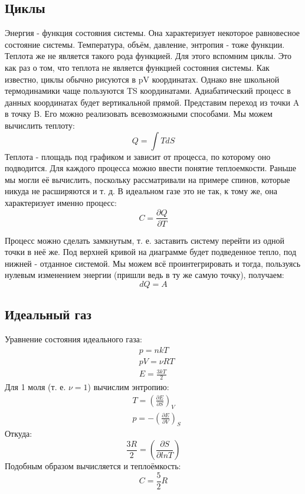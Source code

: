 \documentclass[a4paper, 12pt]{article}
\begin{document}
	\subsection{Циклы}
	Энергия - функция состояния системы. Она характеризует некоторое равновесное состояние системы. Температура, объём, давление, энтропия - тоже функции. Теплота же не является такого рода функцией. Для этого вспомним циклы. Это как раз о том, что теплота не является функцией состояния системы. Как известно, циклы обычно рисуются в pV координатах. Однако вне школьной термодинамики чаще пользуются TS координатами. Адиабатический процесс в данных координатах будет вертикальной прямой. Представим переход из точки A в точку B. Его можно реализовать всевозможными способами. Мы можем вычислить теплоту:
	\begin{equation*}
		Q = \int TdS	
	\end{equation*}
	Теплота - площадь под графиком и зависит от процесса, по которому оно подводится. Для каждого процесса можно ввести понятие теплоемкости. Раньше мы могли её вычислить, поскольку рассматривали на примере спинов, которые никуда не расширяются и т. д.  В идеальном газе это не так, к тому же, она характеризует именно процесс: 
	\begin{equation*}
		C = \frac{\partial Q}{\partial T}
	\end{equation*}
	
	Процесс можно сделать замкнутым, т. е. заставить систему перейти из одной точки в неё же. Под верхней кривой на диаграмме будет подведенное тепло, под нижней - отданное системой. Мы можем всё проинтегрировать и тогда, пользуясь нулевым изменением энергии (пришли ведь в ту же самую точку), получаем:
	\begin{equation*}
		dQ = A
	\end{equation*}
	\subsection{Идеальный газ}
	Уравнение состояния идеального газа:
	\begin{equation*}
		\begin{aligned}
			& p = nkT           \\
			& pV = \nu RT       \\
			& E = \frac{3kT}{2} 
		\end{aligned}
	\end{equation*}
	Для 1 моля (т. е. $\nu = 1$) вычислим энтропию:
	\begin{equation*}
		\begin{aligned}
			& T = (\frac{\partial E}{\partial S})_{V}  \\
			& p = -(\frac{\partial E}{\partial V})_{S} 
		\end{aligned}
	\end{equation*}
	Откуда:
	\begin{equation*}
		\frac{3R}{2} = (\frac{\partial S}{\partial lnT})
	\end{equation*}
	Подобным образом вычисляется и теплоёмкость:
	\begin{equation*}
		C = \frac{5}{2} R
	\end{equation*}
\end{document}
